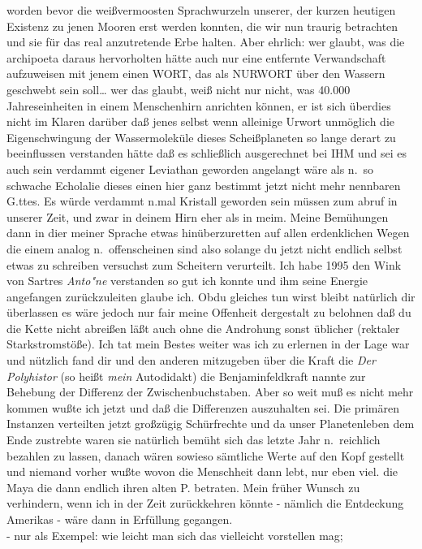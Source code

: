 \documentclass[
]{article}
\begin{document}
worden bevor die weißvermoosten Sprachwurzeln unserer, der kurzen
heutigen Existenz zu jenen Mooren erst werden konnten, die wir nun
traurig betrachten und sie für das real anzutretende Erbe halten. Aber
ehrlich: wer glaubt, was die archipoeta daraus hervorholten hätte auch
nur eine entfernte Verwandschaft aufzuweisen mit jenem einen WORT, das
als NURWORT über den Wassern geschwebt sein soll\ldots{} wer das glaubt,
weiß nicht nur nicht, was 40.000 Jahreseinheiten in einem Menschenhirn
anrichten können, er ist sich überdies nicht im Klaren darüber daß jenes
selbst wenn alleinige Urwort unmöglich die Eigenschwingung der
Wassermoleküle dieses Scheißplaneten so lange derart zu beeinflussen
verstanden hätte daß es schließlich ausgerechnet bei IHM und sei es auch
sein verdammt eigener Leviathan geworden angelangt wäre als n.~so
schwache Echolalie dieses einen hier ganz bestimmt jetzt nicht mehr
nennbaren G.ttes. Es würde verdammt n.mal Kristall geworden sein müssen
zum abruf in unserer Zeit, und zwar in deinem Hirn eher als in meim.
Meine Bemühungen dann in dier meiner Sprache etwas hinüberzuretten auf
allen erdenklichen Wegen die einem analog n.~offenscheinen sind also
solange du jetzt nicht endlich selbst etwas zu schreiben versuchst zum
Scheitern verurteilt. Ich habe 1995 den Wink von Sartres \emph{Anto"ne}
verstanden so gut ich konnte und ihm seine Energie angefangen
zurückzuleiten glaube ich. Obdu gleiches tun wirst bleibt natürlich dir
überlassen es wäre jedoch nur fair meine Offenheit dergestalt zu
belohnen daß du die Kette nicht abreißen läßt auch ohne die Androhung
sonst üblicher (rektaler Starkstromstöße). Ich tat mein Bestes weiter
was ich zu erlernen in der Lage war und nützlich fand dir und den
anderen mitzugeben über die Kraft die \emph{Der Polyhistor} (so heißt
\emph{mein }Autodidakt) die Benjaminfeldkraft nannte zur Behebung der
Differenz der Zwischenbuchstaben. Aber so weit muß es nicht mehr kommen
wußte ich jetzt und daß die Differenzen auszuhalten sei. Die primären
Instanzen verteilten jetzt großzügig Schürfrechte und da unser
Planetenleben dem Ende zustrebte waren sie natürlich bemüht sich das
letzte Jahr n.~reichlich bezahlen zu lassen, danach wären sowieso
sämtliche Werte auf den Kopf gestellt und niemand vorher wußte wovon die
Menschheit dann lebt, nur eben viel. die Maya die dann endlich ihren
alten P. betraten. Mein früher Wunsch zu verhindern, wenn ich in der
Zeit zurückkehren könnte - nämlich die Entdeckung Amerikas - wäre dann
in Erfüllung gegangen.\\
- nur als Exempel: wie leicht man sich das vielleicht vorstellen mag;
\end{document}
